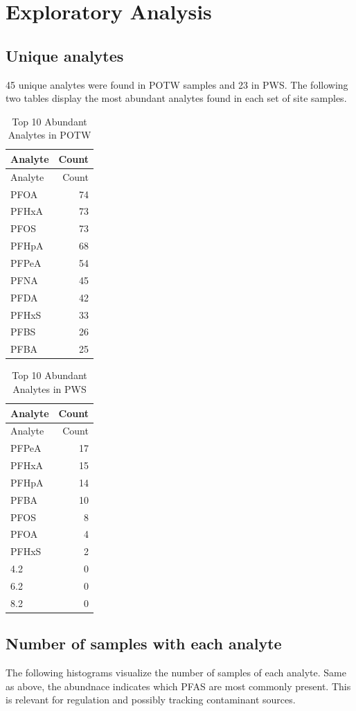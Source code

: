 \documentclass[
  12pt,
]{article}
\begin{document}
\newpage

\hypertarget{exploratory-analysis}{%
\section{Exploratory Analysis}\label{exploratory-analysis}}

\hypertarget{unique-analytes}{%
\subsection{Unique analytes}\label{unique-analytes}}

45 unique analytes were found in POTW samples and 23 in PWS. The
following two tables display the most abundant analytes found in each
set of site samples.

\begin{longtable}[]{@{}lr@{}}
\caption{Top 10 Abundant Analytes in POTW}\tabularnewline
\toprule
Analyte & Count\tabularnewline
\midrule
\endfirsthead
\toprule
Analyte & Count\tabularnewline
\midrule
\endhead
PFOA & 74\tabularnewline
PFHxA & 73\tabularnewline
PFOS & 73\tabularnewline
PFHpA & 68\tabularnewline
PFPeA & 54\tabularnewline
PFNA & 45\tabularnewline
PFDA & 42\tabularnewline
PFHxS & 33\tabularnewline
PFBS & 26\tabularnewline
PFBA & 25\tabularnewline
\bottomrule
\end{longtable}

\begin{longtable}[]{@{}lr@{}}
\caption{Top 10 Abundant Analytes in PWS}\tabularnewline
\toprule
Analyte & Count\tabularnewline
\midrule
\endfirsthead
\toprule
Analyte & Count\tabularnewline
\midrule
\endhead
PFPeA & 17\tabularnewline
PFHxA & 15\tabularnewline
PFHpA & 14\tabularnewline
PFBA & 10\tabularnewline
PFOS & 8\tabularnewline
PFOA & 4\tabularnewline
PFHxS & 2\tabularnewline
4.2 & 0\tabularnewline
6.2 & 0\tabularnewline
8.2 & 0\tabularnewline
\bottomrule
\end{longtable}

\hypertarget{number-of-samples-with-each-analyte}{%
\subsection{Number of samples with each
analyte}\label{number-of-samples-with-each-analyte}}

The following histograms visualize the number of samples of each
analyte. Same as above, the abundnace indicates which PFAS are most
commonly present. This is relevant for regulation and possibly tracking
contaminant sources.
\end{document}
